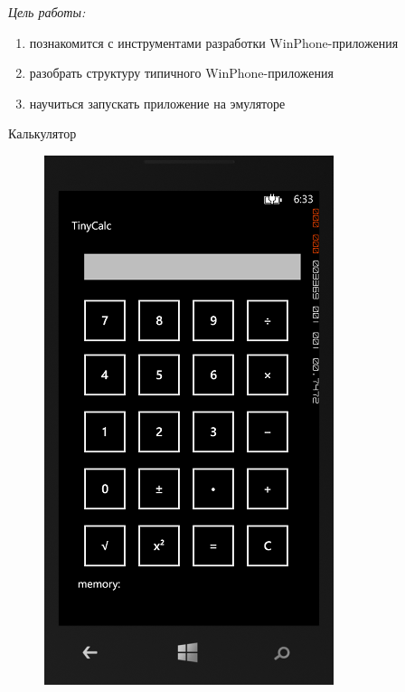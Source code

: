 \documentclass[pscyr,nonums]{hedlab}
\begin{document}
    \makeheader
    \lstset{language=[Sharp]C, basicstyle=\tiny}

    \noindent\emph{Цель работы:} 
    \begin{enumerate}
        \item познакомится с инструментами разработки WinPhone-приложения
        \item разобрать структуру типичного WinPhone-приложения
        \item научиться запускать приложение на эмуляторе
    \end{enumerate}

    \noindent Калькулятор
    \begin{figure} 
        \includegraphics[width=.3\textwidth]{image}
    \end{figure}
    
\end{document}
